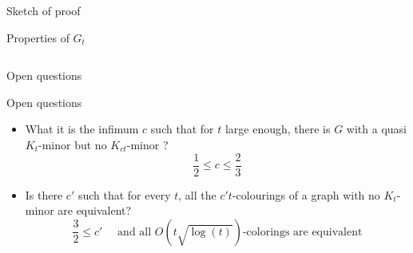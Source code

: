\documentclass[11pt,xcolor=dvipsnames,presentation,aspectratio=169]{beamer}
\begin{document}
\begin{frame}{Sketch of proof}
{\begin{block}{Properties of $G_t$}
\begin{columns}
\begin{column}{.35\linewidth}
\begin{center}
        \end{center}
      \end{column}
    \end{columns}
  \end{block}
  }
\end{frame}

\begin{frame}{Open questions}
  \begin{block}{Open questions}
    \begin{itemize}
    \item What it is the infimum $c$ such that for $t$ large enough, there
      is $G$ with a quasi $K_t$-minor but no $K_{ct}$-minor ?
      $$\frac12 \le c \le \frac23$$
    \item<2-> Is there $c'$ such that for every $t$, all the
      $c't$-colourings of a graph with no $K_t$-minor are equivalent?
      $$\frac32 \le c' \quad \text{ and all }O(t\sqrt{\log(t)})\text{-colorings are equivalent}$$
    \end{itemize}
  \end{block}

\end{frame}
\end{document}
